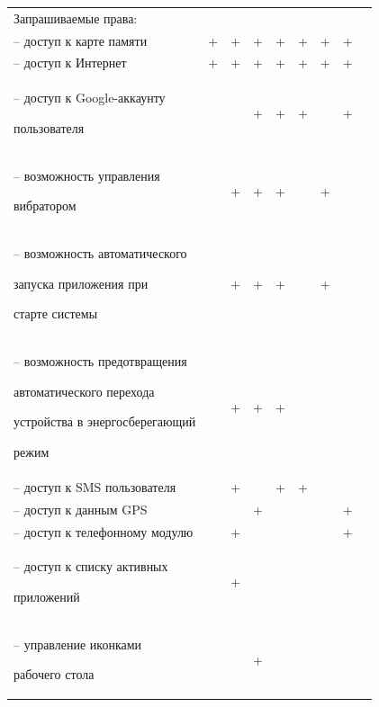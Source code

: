 \begin{table} [h!]
{\begin{tabular}{| m{6.6cm} | c | c | c | c | c | c | c | c |}
      Запрашиваемые права:
      & & & & & & & & \\

      -- доступ к карте памяти
      & +
      & +
      & +
      & +
      & +
      & +
      & +
      & \\

      -- доступ к Интернет
      & +
      & +
      & +
      & +
      & +
      & +
      & +
      & \\

      -- доступ к Google-аккаунту \par пользователя
      &
      &
      & +
      & +
      & +
      &
      & +
      & \\

      -- возможность управления \par вибратором
      &
      & +
      & +
      & +
      &
      & +
      &
      & \\

      -- возможность автоматического \par запуска приложения при \par старте системы
      &
      & +
      & +
      & +
      &
      & +
      &
      & \\

      -- возможность предотвращения \par
      автоматического перехода \par
      устройства в энергосберегающий \par
      режим
      &
      & +
      & +
      & +
      &
      &
      &
      & \\

      -- доступ к SMS пользователя
      &
      & +
      &
      & +
      & +
      &
      &
      & \\

      -- доступ к данным GPS
      &
      &
      & +
      &
      &
      &
      & +
      & \\

      -- доступ к телефонному модулю
      &
      & +
      &
      &
      &
      &
      & +
      & \\

      -- доступ к списку активных \par приложений
      &
      & +
      &
      &
      &
      &
      &
      & \\

      -- управление иконками \par рабочего стола
      &
      &
      & +
      &
      &
      &
      &
      & \\


\end{tabular}}
\end{table}
